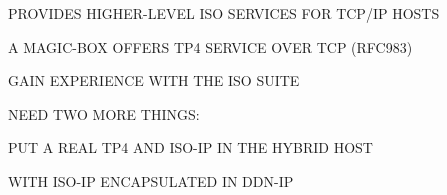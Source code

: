 \begin{bwslide}

\vspace{0.25in}
\end{bwslide}


\begin{bwslide}

\begin{nrtc}
\item	PROVIDES HIGHER-LEVEL ISO SERVICES FOR TCP/IP HOSTS

\item	A MAGIC-BOX OFFERS TP4 SERVICE OVER TCP (RFC983)

\item	GAIN EXPERIENCE WITH THE ISO SUITE
\end{nrtc}
\end{bwslide}


\begin{bwslide}

\end{bwslide}


\begin{bwslide}

\vspace{0.25in}
\end{bwslide}


\begin{bwslide}

\begin{nrtc}
\item	NEED TWO MORE THINGS:
    \begin{nrtc}
    \item	PUT A REAL TP4 AND ISO-IP IN THE HYBRID HOST

    \item	WITH ISO-IP ENCAPSULATED IN DDN-IP
    \end{nrtc}
\end{nrtc}
\end{bwslide}


\begin{bwslide}

\end{bwslide}


\begin{bwslide}

\vspace{0.25in}
\end{bwslide}


